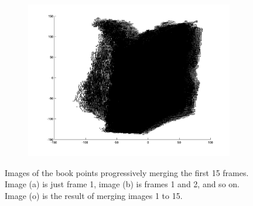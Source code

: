 \begin{figure}
\begin{subfigure}[b]{0.3\textwidth}
		\includegraphics[width=\textwidth]{Images/Book15.png}
		\caption{}
	\end{subfigure}	
	
	\caption{Images of the book points progressively merging the first 15 frames. Image (a) is just frame 1, image (b) is frames 1 and 2, and so on. Image (o) is the result of merging images 1 to 15.}
	\label{fig:mergedBooks1}
\end{figure}

